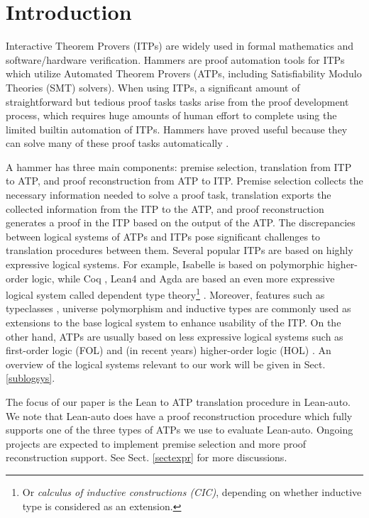 \section{Introduction}

  Interactive Theorem Provers (ITPs) \cite{Harrison2014HistoryOI}
  are widely used in formal mathematics and software/hardware verification. Hammers
  \cite{Blanchette2016HammeringTQ,Czajka2018HammerFC} are proof automation tools for
  ITPs which utilize Automated Theorem Provers (ATPs, including Satisfiability Modulo Theories (SMT) solvers).
  When using ITPs, a significant amount of straightforward but tedious proof tasks
  tasks arise from the proof development process, which requires huge amounts of human
  effort to complete using the limited builtin automation of ITPs. Hammers have proved useful
  because they can solve many of these proof tasks automatically \cite{Paulson2012ThreeYO}.
  
  A hammer has three main components: premise selection, translation from ITP to
  ATP, and proof reconstruction from ATP to ITP. Premise selection collects
  the necessary information needed to solve a proof task, translation exports
  the collected information from the ITP to the ATP, and proof reconstruction generates
  a proof in the ITP based on the output of the ATP. The discrepancies between logical systems of ATPs and ITPs pose
  significant challenges to translation procedures between them.
  Several popular ITPs are based on highly expressive logical systems.
  For example, Isabelle \cite{Isabelle} is based on polymorphic higher-order logic, while
  Coq \cite{CoqRefMan}, Lean4 \cite{Lean4} and Agda \cite{Agda}
  are based an even more expressive logical system called dependent type
  theory\footnote{Or \textit{calculus of inductive constructions (CIC)}, depending
  on whether inductive type is considered as an extension.}
  \cite{LambdaWithType,Coquand1988}.
  Moreover, features such as typeclasses \cite{TypeClassHaskell}, universe polymorphism \cite{UPolyCoq} and inductive types \cite{CICIndDef}
  are commonly used as extensions to the base logical system to enhance usability of the ITP.
  On the other hand, ATPs are usually based on less expressive logical systems such
  as first-order logic (FOL) \cite{CVC5,Vampire,Z3Paper,EProver} and (in recent years)
  higher-order logic (HOL) \cite{HOVampire,ZipperpositionMakeWork,HOEProver}.
  An overview of the logical systems relevant to our work will be given in Sect. \ref{sublogsys}.

  The focus of our paper is the Lean to ATP translation procedure in Lean-auto.
  We note that Lean-auto does have a proof reconstruction procedure which fully supports
  one of the three types of ATPs we use to evaluate Lean-auto.
  Ongoing projects are expected to implement premise selection and more proof reconstruction support.
  See Sect. \ref{sectexpr} for more discussions.

